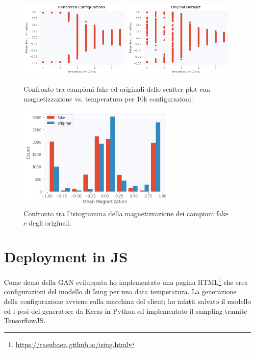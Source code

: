 \documentclass[Lau, noexaminfo, oneside]{sapthesis} %
\begin{document}
\begin{figure}[H]
\includegraphics[width=0.49\textwidth]{fakescatter.png}
\includegraphics[width=0.49\textwidth]{origscatter.png}
\centering
\caption{Confronto tra campioni fake ed originali dello scatter plot con magnetizzazione vs. temperatura per 10k configurazioni.}
\end{figure}
\begin{figure}[H]
\includegraphics[width=0.7\textwidth]{hist.png}
\centering
\caption{Confronto tra l'istogramma della magnetizzazione dei campioni fake e degli originali.}
\end{figure}
\section{Deployment in JS}
Come demo della GAN sviluppata ho implementato una pagina HTML\footnote{\url{https://raeubaen.github.io/ising.html}} che crea configurazioni del modello di Ising per una data temperatura. La generazione della configurazione avviene sulla macchina del client; ho infatti salvato il modello ed i pesi del generatore da Keras in Python ed implementato il sampling tramite TensorflowJS.
\newpage
\nocite{reference}
{}

\end{document}
